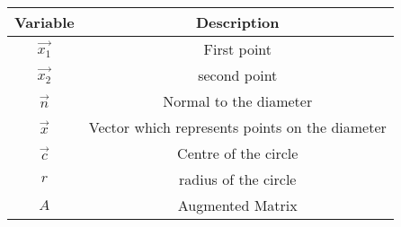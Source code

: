 \begin{tabular}[12pt]{ |c|c|}
    \hline
    \textbf{Variable} & \textbf{Description}\\ 
    \hline
    $\vec{x_1}$ & First point\\
    \hline
    $\vec{x_2}$ & second point\\
    \hline
    $\vec{n}$ & Normal to the diameter\\
    \hline
    $\vec{x}$ & Vector which represents points on the diameter\\
    \hline
    $\vec{c}$ & Centre of the circle\\
    \hline
    $r$ & radius of the circle\\
    \hline
    $A$ & Augmented Matrix\\
    \hline
    \end{tabular}
